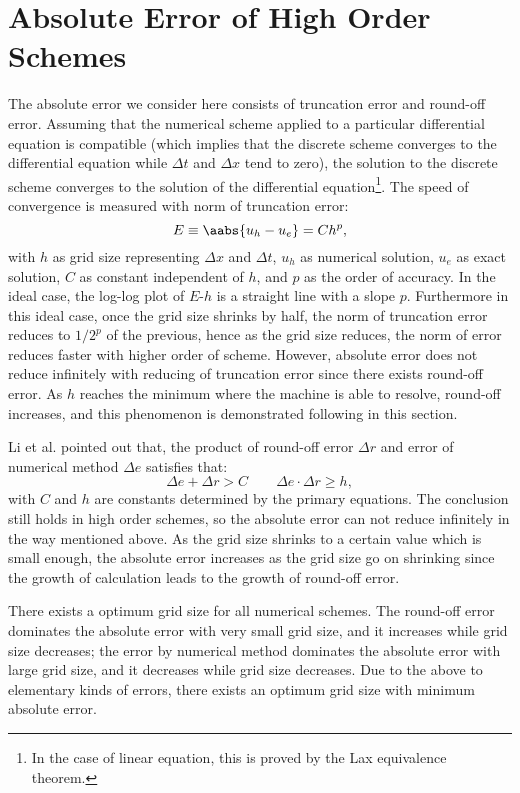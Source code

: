\documentclass[]{article}
\begin{document}
\section{Absolute Error of High Order Schemes} \label{sec:abserr-high-order}
The absolute error we consider here consists of truncation error and round-off
error.
Assuming that the numerical scheme applied to a particular differential equation is
compatible (which implies that the discrete scheme converges to the
differential equation while
$\Delta t$ and $\Delta x$ tend to zero), the solution to the discrete scheme
converges to the solution of the differential equation\footnote{In the
case of linear equation, this is proved by the Lax equivalence theorem\cite{lax1956survey}.}.
The speed of convergence is measured with norm of truncation error:
\begin{equation}
  E\equiv\aabs{u_h-u_e} = Ch^p,
  \label{eq:error-norm}
\end{equation}
with $h$ as grid size representing $\Delta x$ and $\Delta t$, $u_h$ as numerical
solution, $u_e$ as exact solution, $C$ as constant independent of $h$, and
$p$ as the order of accuracy. In the ideal case, the log-log plot of
$E$-$h$ is a straight line with a slope $p$. Furthermore in this ideal case,
once the grid size shrinks by half, the norm of truncation error reduces to $1/2^p$ of the
previous, hence as the grid size reduces, the norm of error reduces faster with
higher order of scheme. However, absolute error does not reduce infinitely with
reducing of truncation error since there exists round-off error. As $h$ reaches
the minimum where the machine is able to resolve, round-off increases, and
this phenomenon is demonstrated following in this section.

Li et al.\cite{li2001computational} pointed out that, the product
of round-off error $\Delta r$ and error of numerical method $\Delta e$
satisfies that:
\begin{equation}
\Delta e + \Delta r > C \qquad \Delta e \cdot \Delta r \geq h,
\end{equation}
with $C$ and $h$ are constants determined by the primary
equations. The conclusion still holds in high order schemes, so the
absolute error can not reduce infinitely in the way mentioned above. As
the grid size shrinks to a certain value which is small enough, the
absolute error increases as the grid size go on shrinking since the
growth of calculation leads to the growth of round-off error.

There exists a optimum grid size for all numerical schemes. The
round-off error dominates the absolute error with very small grid
size, and it increases while grid size decreases; the error by
numerical method dominates the absolute error with large grid size,
and it decreases while grid size decreases. Due to the above to
elementary kinds of errors, there exists an optimum grid size with
minimum absolute error. 
\end{document}
